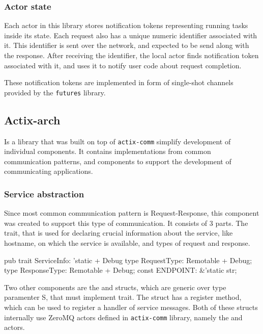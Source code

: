\subsubsection{Actor state}
Each actor in this library stores notification tokens representing running tasks inside its state. Each request also
has a unique numeric identifier associated with it. This identifier is sent over the network, and expected to be
send along with the response. After receiving the identifier, the local actor finds notification token associated
with it, and uses it to notify user code about request completion.

These notification tokens are implemented in form of single-shot channels provided by the \verb|futures| library.

\subsection{Actix-arch}
Is a library that was built on top of \verb|actix-comm| simplify development of individual components. It contains implementations
from common communication patterns, and components to support the development of communicating applications.

\subsubsection{Service abstraction}
Since most common communication pattern is Request-Response, this component was created to support this type of communication.
It consists of 3 parts. The  trait, that is used for declaring crucial information about the service, like
hostname, on which the service is available, and types of request and response.

\begin{code}[language=rust,label={svcinfo_trait},caption={ServiceInfo trait definition}]
pub trait ServiceInfo: 'static + Debug {
    type RequestType: Remotable + Debug;
    type ResponseType: Remotable + Debug;
    const ENDPOINT: &'static str;
}
\end{code}

Two other components are the  and  structs, which are generic over type paramenter
S, that must implement  trait. The  struct has a register method, which can be used to register a handler of service messages.
Both of these structs internally use ZeroMQ actors defined in \verb|actix-comm| library, namely the  and  actors.

